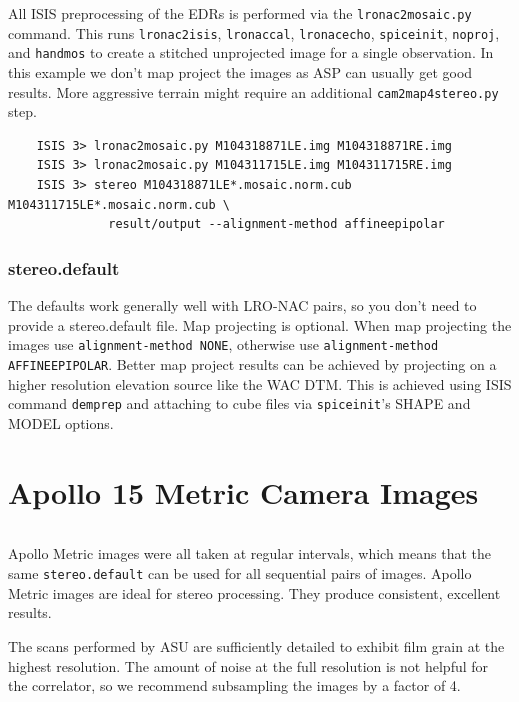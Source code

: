 All ISIS preprocessing of the EDRs is performed via the
\texttt{lronac2mosaic.py} command. This runs \texttt{lronac2isis},
\texttt{lronaccal}, \texttt{lronacecho}, \texttt{spiceinit},
\texttt{noproj}, and \texttt{handmos} to create a stitched unprojected
image for a single observation. In this example we don't map project
the images as ASP can usually get good results. More aggressive
terrain might require an additional \texttt{cam2map4stereo.py} step.

\begin{verbatim}
    ISIS 3> lronac2mosaic.py M104318871LE.img M104318871RE.img
    ISIS 3> lronac2mosaic.py M104311715LE.img M104311715RE.img
    ISIS 3> stereo M104318871LE*.mosaic.norm.cub M104311715LE*.mosaic.norm.cub \
              result/output --alignment-method affineepipolar
\end{verbatim}

\subsubsection*{stereo.default}

The defaults work generally well with LRO-NAC pairs, so you don't need
to provide a stereo.default file. Map projecting is optional. When map
projecting the images use \texttt{alignment-method NONE}, otherwise
use \texttt{alignment-method AFFINEEPIPOLAR}. Better map project
results can be achieved by projecting on a higher resolution elevation
source like the WAC DTM. This is achieved using ISIS command
\texttt{demprep} and attaching to cube files via \texttt{spiceinit}'s
SHAPE and MODEL options.

\section{Apollo 15 Metric Camera Images}

\begin{tabular}{ r c r c}

\end{tabular}

Apollo Metric images were all taken at regular intervals, which means
that the same \texttt{stereo.default} can be used for all sequential
pairs of images. Apollo Metric images are ideal for stereo processing.
They produce consistent, excellent results.

The scans performed by ASU are sufficiently detailed to exhibit film
grain at the highest resolution.  The amount of noise at the full
resolution is not helpful for the correlator, so we recommend
subsampling the images by a factor of 4.

